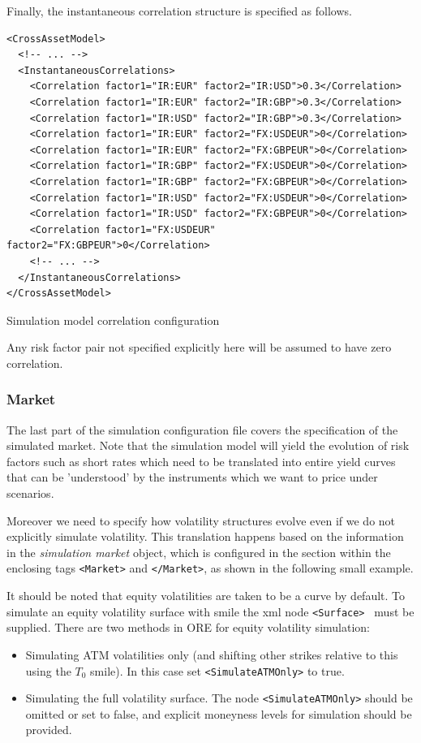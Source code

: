 \documentclass[12pt, a4paper]{article}
\begin{document}
{{\medskip
Finally, the instantaneous correlation structure is specified as follows.

\begin{listing}[H]
\begin{verbatim}
<CrossAssetModel>
  <!-- ... -->
  <InstantaneousCorrelations>
    <Correlation factor1="IR:EUR" factor2="IR:USD">0.3</Correlation>
    <Correlation factor1="IR:EUR" factor2="IR:GBP">0.3</Correlation>
    <Correlation factor1="IR:USD" factor2="IR:GBP">0.3</Correlation>
    <Correlation factor1="IR:EUR" factor2="FX:USDEUR">0</Correlation>
    <Correlation factor1="IR:EUR" factor2="FX:GBPEUR">0</Correlation>
    <Correlation factor1="IR:GBP" factor2="FX:USDEUR">0</Correlation>
    <Correlation factor1="IR:GBP" factor2="FX:GBPEUR">0</Correlation>
    <Correlation factor1="IR:USD" factor2="FX:USDEUR">0</Correlation>
    <Correlation factor1="IR:USD" factor2="FX:GBPEUR">0</Correlation>
    <Correlation factor1="FX:USDEUR" factor2="FX:GBPEUR">0</Correlation>
    <!-- ... --> 
  </InstantaneousCorrelations>
</CrossAssetModel>
\end{verbatim}
\caption{Simulation model correlation configuration}
\label{lst:simulation_model_correlation_configuration}
\end{listing}

Any risk factor pair not specified explicitly here will be assumed to have zero correlation.

\subsubsection{Market}\label{sec:sim_market}

The last part of the simulation configuration file covers the specification of the simulated market.  Note that the
simulation model will yield the evolution of risk factors such as short rates which need to be translated into entire
yield curves that can be 'understood' by the instruments which we want to price under scenarios.  

Moreover we need to specify how volatility structures evolve even if we do not explicitly simulate volatility. This 
translation happens based on the information in the {\em simulation market} object, which is configured in the section 
within the enclosing tags {\tt <Market>} and {\tt </Market>}, as shown in the following small example.

It should be noted that equity volatilities are taken to be a curve by default. To simulate an equity volatility surface with smile the xml node {\tt <Surface> } must be supplied.
There are two methods in ORE for equity volatility simulation: 
\begin{itemize}
\item Simulating ATM volatilities only (and shifting other strikes relative to this using the $T_{0}$ smile). In this case set {\tt <SimulateATMOnly>} to true.
\item Simulating the full volatility surface. The node {\tt <SimulateATMOnly>} should be omitted or set to false, and explicit moneyness levels for simulation should be provided.
\end{itemize}

}}
\end{document}
